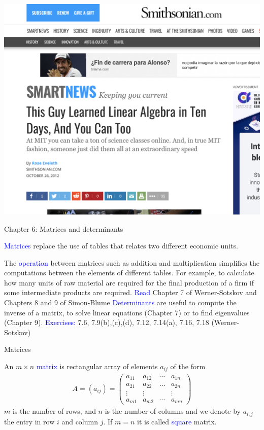 \documentclass[11pt,aspectratio=169]{beamer}
\begin{document}
\begin{frame}{}
\centering\includegraphics[height=\paperheight]{img/LinAlg10days.png}	
\end{frame}


\begin{frame}{Chapter 6: Matrices and determinants}

\textcolor{blue}{Matrices} replace the use of tables that relates two different economic units. 

\vskip 12pt
The \textcolor{blue}{operation} between matrices such as addition and multiplication simplifies the computations between the elements of different tables. 
\vskip 12pt
For example, to calculate how many units of raw material are required for the final production of a firm if some intermediate products are required.
\vskip 12pt
\textcolor{blue}{Read}  Chapter 7 of Werner-Sotskov and Chapters 8 and 9 of Simon-Blume
\vskip 12pt
\textcolor{blue}{Determinants} are useful to compute the inverse of a matrix, to solve linear equations (Chapter 7) or to find eigenvalues (Chapter 9).
\vskip 12pt
\textcolor{blue}{Exercises:} 7.6, 
7.9(b),(c),(d), 7.12, 7.14(a), 7.16, 7.18 (Werner-Sotskov)\end{frame}


\begin{frame}{Matrices}

An $m\times n$ \textcolor{blue}{matrix} is rectangular array of elements $a_{ij}$ of the form 
\begin{align*}A=(a_{ij})=\begin{pmatrix}a_{11} & a_{12} & \cdots & a_{1n}\\
a_{21} & a_{22} & \dots & a_{2n} \\
\vdots & \vdots &&\vdots \\
a_{m1}& a_{m2} &\cdots & a_{mn}
\end{pmatrix}
\end{align*}
$m$ is the number of rows, and $n$ is the number of columns and we denote by $a_{i,j}$ the entry in row $i$ and column $j$.
\vskip 12pt
If $m=n$ it is called \textcolor{blue}{square} matrix. 
\end{frame}
\end{document}

